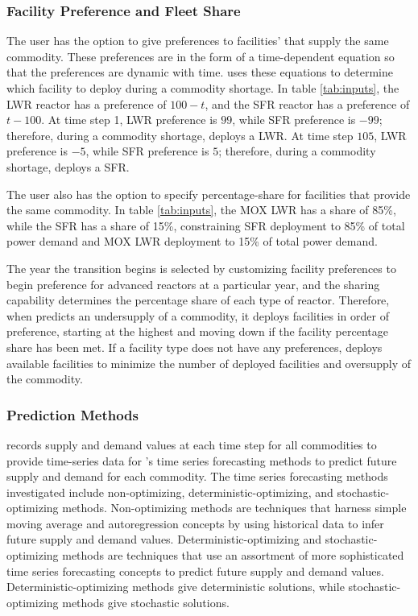     \subsubsection{\textbf{Facility Preference and Fleet Share}}
    The user has the option to give preferences to facilities' 
    that supply the same commodity. 
    These preferences are in the form of a time-dependent 
    equation so that the preferences are dynamic with time. 
    \deploy uses these equations to determine which facility 
    to deploy during a commodity shortage.  
    In table \ref{tab:inputs}, 
    the \gls{LWR} reactor has a preference of $100-t$, and the 
    \gls{SFR} reactor has a preference of $t-100$. 
    At time step 1, LWR preference is $99$, while SFR preference is $-99$; 
    therefore, during a commodity shortage, \deploy deploys a LWR. 
    At time step $105$, LWR preference is $-5$, while SFR preference is $5$; 
    therefore, during a commodity shortage, \deploy deploys a SFR. 

    The user also has the option to specify percentage-share for facilities 
    that provide the same commodity.   
    In table \ref{tab:inputs}, 
    the \gls{MOX} \gls{LWR} has a share of 85\%, while 
    the \gls{SFR} has a share of 15\%, constraining
    \gls{SFR} deployment to 85\% of total power demand 
    and \gls{MOX} \gls{LWR} deployment to 15\% of total power demand.  

    The year the transition begins is selected by customizing facility 
    preferences to begin preference for advanced reactors at a particular year,
    and the sharing capability determines the percentage 
    share of each type of reactor. 
    Therefore, when \deploy predicts an undersupply of a commodity, 
    it deploys facilities in order of preference, starting at 
    the highest and moving down if the facility percentage share 
    has been met. 
    If a facility type does not have any preferences, \deploy 
    deploys available facilities to minimize the number of deployed 
    facilities and oversupply of the commodity.

\subsubsection{\textbf{Prediction Methods}}
\deploy records supply and demand values at each time step for all 
commodities to provide time-series data for \deploy's time series 
forecasting methods to predict future supply and demand for each 
commodity.  
The time series forecasting methods investigated include non-optimizing, 
deterministic-optimizing, and stochastic-optimizing methods. 
Non-optimizing methods are techniques that harness 
simple moving average and autoregression concepts by using 
historical data to infer future supply and demand values. 
Deterministic-optimizing and stochastic-optimizing methods are techniques 
that use an assortment of more sophisticated time series forecasting 
concepts to predict future supply and demand values. 
Deterministic-optimizing methods give deterministic solutions,
while stochastic-optimizing methods give stochastic solutions. 

